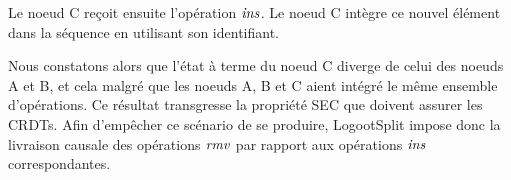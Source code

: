 Le noeud C reçoit ensuite l'opération $\mathit{ins}$.
Le noeud C intègre ce nouvel élément dans la séquence en utilisant son identifiant.

Nous constatons alors que l'état à terme du noeud C diverge de celui des noeuds A et B, et cela malgré que les noeuds A, B et C aient intégré le même ensemble d'opérations.
Ce résultat transgresse la propriété \ac{SEC} \cite{shapiro_2011_crdt} que doivent assurer les \acp{CRDT}.
Afin d'empêcher ce scénario de se produire, LogootSplit impose donc la livraison causale des opérations $\mathit{rmv}$ par rapport aux opérations $\mathit{ins}$ correspondantes.
